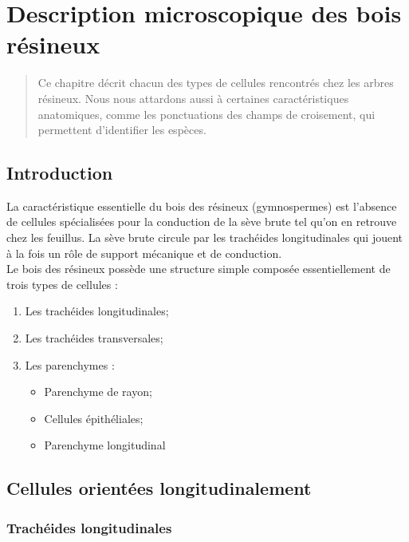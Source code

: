 \chapter{Description microscopique des bois résineux}\label{resineux}

\begin{abstract}
Ce chapitre décrit chacun des types de cellules rencontrés chez les arbres résineux. Nous nous attardons aussi à certaines caractéristiques anatomiques, comme les ponctuations des champs de croisement, qui permettent d'identifier les espèces.
\end{abstract}

\minitoc

\section{Introduction}

La caractéristique essentielle du bois des résineux (gymnospermes) est l'absence de cellules spécialisées pour la conduction de la sève brute tel qu'on en retrouve chez les feuillus. La sève brute circule par les trachéides longitudinales qui jouent à la fois un rôle de support mécanique et de conduction.\\

Le bois des résineux possède une structure simple composée essentiellement de trois types de cellules :

\begin{enumerate}
\item Les trachéides longitudinales;
\item Les trachéides transversales;
\item Les parenchymes :
	\begin{itemize}
	\item Parenchyme de rayon;
	\item Cellules épithéliales;
	\item Parenchyme longitudinal
	\end{itemize}
\end{enumerate}

\section{Cellules orientées longitudinalement}

\subsection{Trachéides longitudinales}

